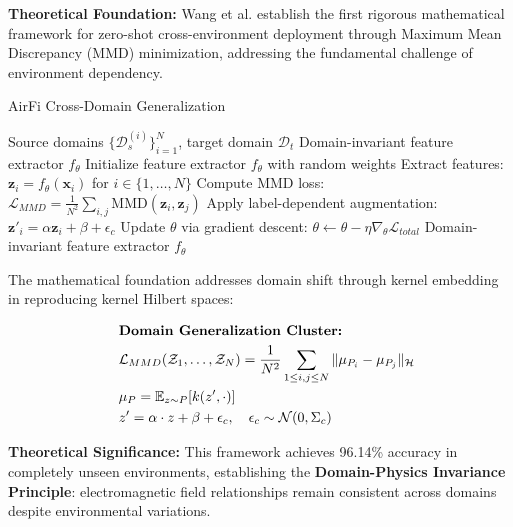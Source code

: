 \documentclass[journal]{IEEEtran}
\begin{document}
\textbf{Theoretical Foundation:} Wang et al. \cite{wang2022airfi} establish the first rigorous mathematical framework for zero-shot cross-environment deployment through Maximum Mean Discrepancy (MMD) minimization, addressing the fundamental challenge of environment dependency.

\begin{algorithm}[h]
\caption{AirFi Cross-Domain Generalization}
\label{alg:airfi_domain}
\begin{algorithmic}[1]
\REQUIRE Source domains $\{\mathcal{D}_s^{(i)}\}_{i=1}^N$, target domain $\mathcal{D}_t$
\ENSURE Domain-invariant feature extractor $f_\theta$
\STATE Initialize feature extractor $f_\theta$ with random weights
        \STATE Extract features: $\mathbf{z}_i = f_\theta(\mathbf{x}_i)$ for $i \in \{1,\ldots,N\}$
        \STATE Compute MMD loss: $\mathcal{L}_{MMD} = \frac{1}{N^2} \sum_{i,j} \text{MMD}(\mathbf{z}_i, \mathbf{z}_j)$
        \STATE Apply label-dependent augmentation: $\mathbf{z}'_i = \alpha \mathbf{z}_i + \beta + \epsilon_c$
        \STATE Update $\theta$ via gradient descent: $\theta \leftarrow \theta - \eta \nabla_\theta \mathcal{L}_{total}$
    \ENDFOR
\ENDFOR
\RETURN Domain-invariant feature extractor $f_\theta$
\end{algorithmic}
\end{algorithm}

The mathematical foundation addresses domain shift through kernel embedding in reproducing kernel Hilbert spaces:

\begin{align}
&\hspace{2em} \text{\textbf{Domain Generalization Cluster:}} \quad &  \nonumber \\
&\hspace{2em} \mathcal{L}_{MMD}(\mathcal{Z}_1, \ldots, \mathcal{Z}_N) = \frac{1}{N^2} \sum_{1 \leq i,j \leq N} \| \mu_{P_i} - \mu_{P_j}\|_{\mathcal{H}} \label{eq:mmd_loss_v4} \\
&\hspace{2em} \mu_P = \mathbb{E}_{z \sim P}[k(z', \cdot)] \label{eq:kernel_mapping_v4} \\
&\hspace{2em} z' = \alpha \cdot z + \beta + \epsilon_c, \quad \epsilon_c \sim \mathcal{N}(0, \Sigma_c) \label{eq:feature_augmentation_v4}
\end{align}

\textbf{Theoretical Significance:} This framework achieves 96.14\% accuracy in completely unseen environments, establishing the \textbf{Domain-Physics Invariance Principle}: electromagnetic field relationships remain consistent across domains despite environmental variations.
\end{document}
